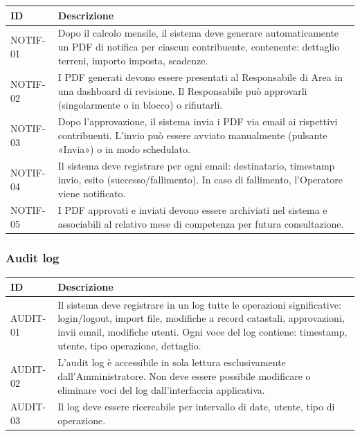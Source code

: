 \documentclass[12pt, a4paper]{article}
\begin{document}
\begin{longtable}{@{}p{2.5cm}p{9.5cm}@{}}
  \toprule
  \textbf{ID} & \textbf{Descrizione} \\
  \midrule
  \endhead

  NOTIF-01 &
  Dopo il calcolo mensile, il sistema deve generare automaticamente un PDF di notifica per
  ciascun contribuente, contenente: dettaglio terreni, importo imposta, scadenze. \\[6pt]

  NOTIF-02 &
  I PDF generati devono essere presentati al Responsabile di Area in una dashboard di
  revisione. Il Responsabile può approvarli (singolarmente o in blocco) o rifiutarli. \\[6pt]

  NOTIF-03 &
  Dopo l'approvazione, il sistema invia i PDF via email ai rispettivi contribuenti.
  L'invio può essere avviato manualmente (pulsante «Invia») o in modo schedulato. \\[6pt]

  NOTIF-04 &
  Il sistema deve registrare per ogni email: destinatario, timestamp invio, esito
  (successo/fallimento). In caso di fallimento, l'Operatore viene notificato. \\[6pt]

  NOTIF-05 &
  I PDF approvati e inviati devono essere archiviati nel sistema e associabili al relativo
  mese di competenza per futura consultazione. \\

  \bottomrule
\end{longtable}

\subsubsection{Audit log}

\begin{longtable}{@{}p{2.5cm}p{9.5cm}@{}}
  \toprule
  \textbf{ID} & \textbf{Descrizione} \\
  \midrule
  \endhead

  AUDIT-01 &
  Il sistema deve registrare in un log tutte le operazioni significative: login/logout,
  import file, modifiche a record catastali, approvazioni, invii email, modifiche utenti.
  Ogni voce del log contiene: timestamp, utente, tipo operazione, dettaglio. \\[6pt]

  AUDIT-02 &
  L'audit log è accessibile in sola lettura esclusivamente dall'Amministratore.
  Non deve essere possibile modificare o eliminare voci del log dall'interfaccia applicativa. \\[6pt]

  AUDIT-03 &
  Il log deve essere ricercabile per intervallo di date, utente, tipo di operazione. \\

  \bottomrule
\end{longtable}
\end{document}
